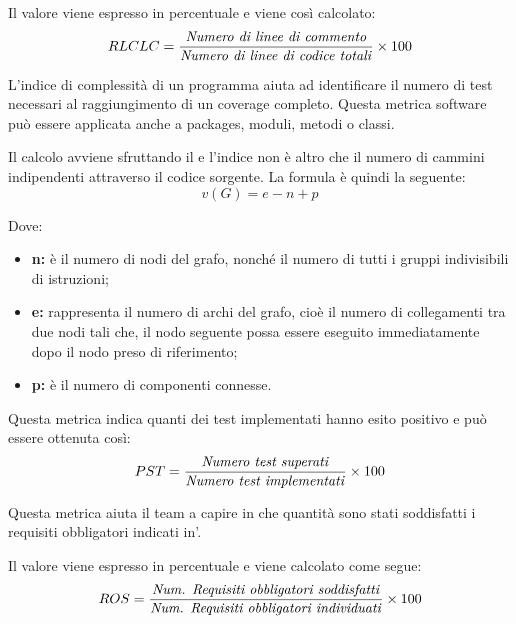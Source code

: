 			Il valore viene espresso in percentuale e viene così calcolato:
			\[ RLCLC = \frac{\mbox{\textit{Numero di linee di commento}}}{\mbox{\textit{Numero di linee di codice totali}}} \times 100 \]

			L'indice di complessità di un programma aiuta ad identificare il numero di test necessari al raggiungimento 
			di un coverage completo. Questa metrica software può essere applicata anche a packages, moduli, metodi o classi.

			Il calcolo avviene sfruttando il  e l'indice non è altro che 
			il numero di cammini indipendenti attraverso il codice sorgente. La formula è quindi la seguente:
			\[ v(G) = e - n + p \]

			Dove:
			\begin{itemize}
				\item \textbf{n:} è il numero di nodi del grafo, nonché il numero di tutti i gruppi indivisibili di istruzioni;
				\item \textbf{e:} rappresenta il numero di archi del grafo, cioè il numero di collegamenti tra due 
				nodi tali che, il nodo seguente possa essere eseguito immediatamente dopo il nodo preso di riferimento;
				\item \textbf{p:} è il numero di componenti connesse.
			\end{itemize}

			Questa metrica indica quanti dei test implementati hanno esito positivo e può essere ottenuta così:
			\[ PST = \frac{\mbox{\textit{Numero test superati}}}{\mbox{\textit{Numero test implementati}}} \times 100 \]


			Questa metrica aiuta il team a capire in che quantità sono stati soddisfatti i requisiti obbligatori 
			indicati in'\vAnalisiDeiRequisiti{}.

			Il valore viene espresso in percentuale e viene calcolato come segue:
			\[ROS = \frac{\mbox{\textit{Num. Requisiti obbligatori soddisfatti}}}{\mbox{\textit{Num. Requisiti obbligatori individuati}}}\times 100\]
